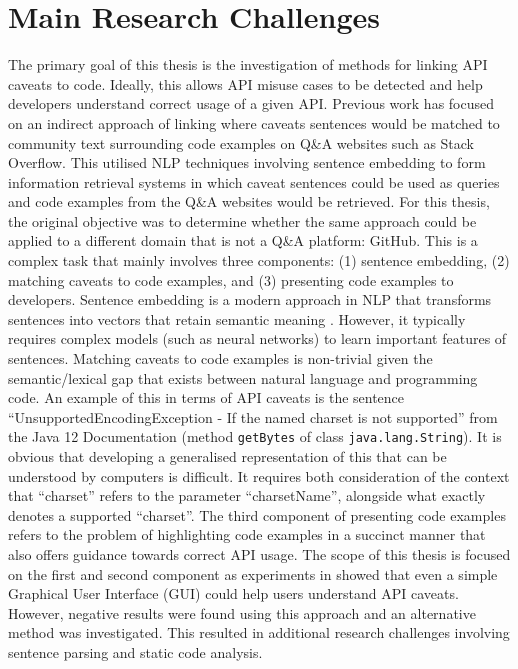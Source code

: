 \section{Main Research Challenges}
\label{sec:mainresearchchallenges}
The primary goal of this thesis is the investigation of methods for linking API caveats to code. Ideally, this allows API misuse cases to be detected and help developers understand correct usage of a given API. Previous work has focused on an indirect approach of linking where caveats sentences would be matched to community text surrounding code examples on Q\&A websites such as Stack Overflow. This utilised NLP techniques involving sentence embedding to form information retrieval systems in which caveat sentences could be used as queries and code examples from the Q\&A websites would be retrieved. For this thesis, the original objective was to determine whether the same approach could be applied to a different domain that is not a Q\&A platform: GitHub. This is a complex task that mainly involves three components: (1) sentence embedding, (2) matching caveats to code examples, and (3) presenting code examples to developers. Sentence embedding is a modern approach in NLP that transforms sentences into vectors that retain semantic meaning \cite{palangi2016deep}. However, it typically requires complex models (such as neural networks) to learn important features of sentences. Matching caveats to code examples is non-trivial given the semantic/lexical gap that exists between natural language and programming code. An example of this in terms of API caveats is the sentence ``UnsupportedEncodingException - If the named charset is not supported'' from the Java 12 Documentation (method \lstinline{getBytes} of class \lstinline{java.lang.String}). It is obvious that developing a generalised representation of this that can be understood by computers is difficult. It requires both consideration of the context that ``charset'' refers to the parameter ``charsetName'', alongside what exactly denotes a supported ``charset''. The third component of presenting code examples refers to the problem of highlighting code examples in a succinct manner that also offers guidance towards correct API usage. The scope of this thesis is focused on the first and second component as experiments in \cite{jiamou} showed that even a simple Graphical User Interface (GUI) could help users understand API caveats. However, negative results were found using this approach and an alternative method was investigated. This resulted in additional research challenges involving sentence parsing and static code analysis.\\

